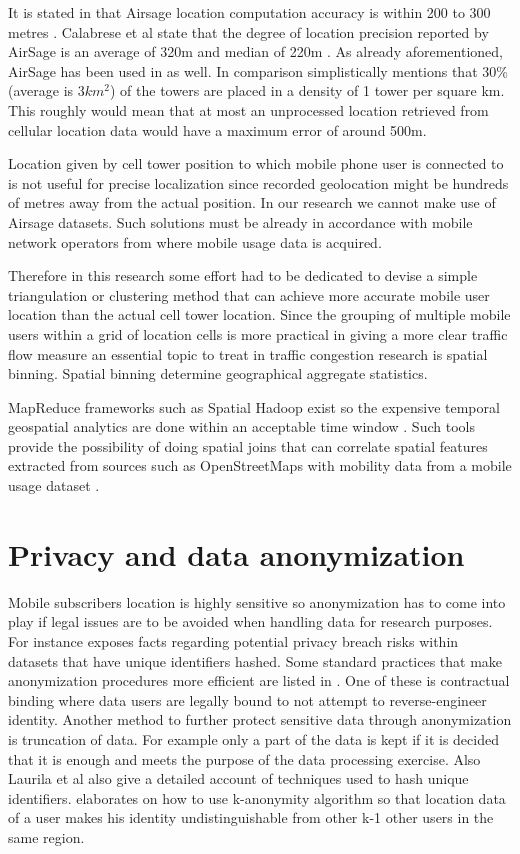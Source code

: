 \documentclass[12pt, a4paper]{report}
\theoremstyle{definition}
\theoremstyle{definition}%
\theoremstyle{definition}%
\theoremstyle{definition}%
\theoremstyle{definition}%
\theoremstyle{definition}%
\begin{document}
It is stated in \cite{Colak2015} that Airsage location computation accuracy is within 200 to 300 metres . Calabrese et al state that the degree of location precision reported by AirSage is an average of 320m and median of 220m \cite{Calabrese2013}. As already aforementioned, AirSage has been used in \cite{Hoteit2014} as well. In comparison \cite{Gonzalez2008} simplistically mentions that 30\% (average is \(3km^{2}\)) of the towers are placed in a density of 1 tower per square km. This roughly would mean that at most an unprocessed location retrieved from cellular location data would have a maximum error of around 500m. 

Location given by cell tower position to which mobile phone user is connected to is not useful for precise localization since recorded geolocation might be hundreds of metres away from the actual position. In our research we cannot make use of Airsage datasets. Such solutions must be already in accordance with mobile network operators from where mobile usage data is acquired.

Therefore in this research some effort had to be dedicated to devise a simple triangulation or clustering method that can achieve more accurate mobile user location than the actual cell tower location. Since the grouping of multiple mobile users within a grid of location cells is more practical in giving a more clear traffic flow measure an essential topic to treat in traffic congestion research is spatial binning. Spatial binning determine geographical aggregate statistics. 

MapReduce frameworks such as Spatial Hadoop exist so the expensive temporal geospatial analytics are done within an acceptable time window \cite{Wu2014,eldawy2015spatialhadoop}. Such tools provide the possibility of doing spatial joins that can correlate spatial features extracted from sources such as OpenStreetMaps with mobility data from a mobile usage dataset \cite{Alarabi2014}.


\section{Privacy and data anonymization} \label{data_anonymization} 


Mobile subscribers location is highly sensitive so anonymization has to come into play if legal issues are to be avoided when handling data for research purposes. For instance \cite{Laurila2012} exposes facts regarding potential privacy breach risks within datasets that have unique identifiers hashed. Some standard practices that make anonymization procedures more efficient are listed in \cite{Laurila2012}. One of these is contractual binding where data users are legally bound to not attempt to reverse-engineer identity. Another method to further protect sensitive data through anonymization is truncation of data. For example only a part of the data is kept if it is decided that it is enough and meets the purpose of the data processing exercise. Also Laurila et al also give a detailed account of techniques used to hash unique identifiers. \cite{Shin} elaborates on how to use k-anonymity algorithm so that location data of a user makes his identity undistinguishable from other k-1 other users in the same region.
\end{document}
